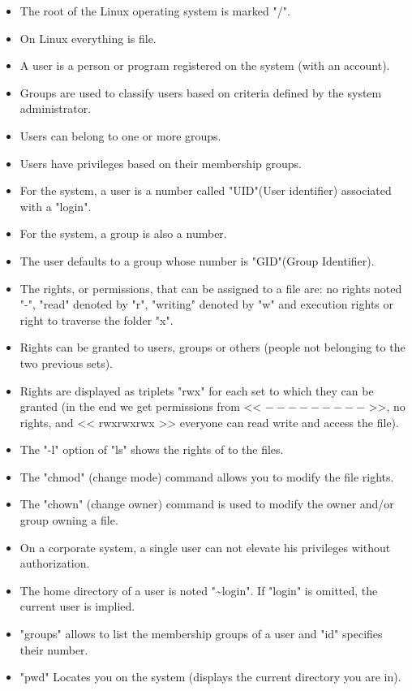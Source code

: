 \documentclass[11pt]{article}
\begin{document}
\begin{itemize}
\item The root of the Linux operating system is marked "/".
\item On Linux everything is file.
\item A user is a person or program registered on the system (with an account).
\item Groups are used to classify users based on criteria defined by the system administrator.
\item Users can belong to one or more groups.
\item Users have privileges based on their membership groups.
\item For the system, a user is a number called "UID"(User identifier) associated with a "login".
\item For the system, a group is also a number.
\item The user defaults to a group whose number is "GID"(Group Identifier).
\item The rights, or permissions, that can be assigned to a file are: no rights noted "-", "read" denoted by "r", "writing" denoted by "w" and execution rights or right to traverse the folder "x".
\item Rights can be granted to users, groups or others (people not belonging to the two previous sets).
\item Rights are displayed as triplets "rwx" for each set to which they can be granted (in the end we get permissions from << $ --------- $ >>, no rights, and << rwxrwxrwx >> everyone can read write and access the file).
\item The "-l" option of "ls" shows the rights of to the files.
\item The "chmod" (change mode) command allows you to modify the file rights.
\item The "chown" (change owner) command is used to modify the owner and/or group owning a file.
\item On a corporate system, a single user can not elevate his privileges without authorization.
\item The home directory of a user is noted "\textasciitilde{}login". If "login" is omitted, the current user is implied.
\item "groups" allows to list the membership groups of a user and "id" specifies their number.
\item "pwd" Locates you on the system (displays the current directory you are in).
\end{itemize}
\end{document}
